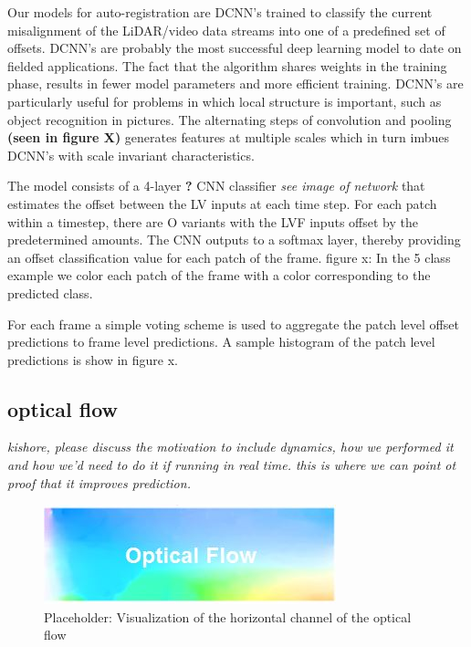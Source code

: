 \documentclass{article}
\begin{document}
Our models for auto-registration are DCNN's trained to classify the current misalignment of the LiDAR/video data streams into one of a predefined set of offsets. DCNN's are probably the most successful deep learning model to date on fielded applications. The fact that the algorithm shares weights in the training phase, results in fewer model parameters and more efficient training. DCNN's are particularly useful for problems in which local structure is important, such as object recognition in pictures. The alternating steps of convolution and pooling \textbf{(seen in figure X)}  generates features at multiple scales which in turn imbues DCNN's with scale invariant characteristics.


The model consists of a 4-layer \textbf{?} CNN classifier \textit{see image of network} that estimates the offset between the LV inputs at each time step. For each patch within a timestep, there are O variants with the LVF inputs offset by the predetermined amounts. The CNN outputs to a softmax layer, thereby providing an offset classification value for each patch of the frame. 
figure x: In the 5 class example we color each patch of the frame with a color corresponding to the predicted class. 

For each frame a simple voting scheme is used to aggregate the patch level offset predictions to frame level predictions. A sample histogram of the patch level predictions is show in figure x.

\subsection{optical flow} \textit{kishore, please discuss the motivation to include dynamics, how we performed it and how we'd need to do it if running in real time. this is where we can point ot proof that it improves prediction.}

\begin{figure}[htbp]
    \centering
        \includegraphics[scale=0.85]{Figures/OptFlow.jpg}
    \caption{Placeholder: Visualization of the horizontal channel of the optical flow}
    \label{fig:Figures_OptFlow placeholder}
\end{figure}
\end{document}
